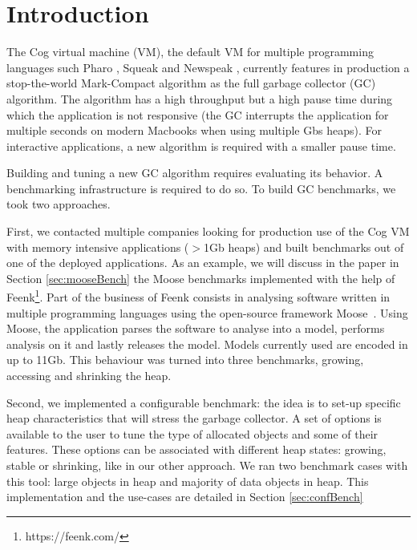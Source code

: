 \documentclass[10pt, sigplan]{acmart}
\begin{document}

\maketitle

\section{Introduction} \label{sec:intro}

The Cog virtual machine (VM), the default VM for multiple programming languages such Pharo \cite{PharoByExample}, Squeak \cite{SqueakByExample} and Newspeak \cite{NewspeakOopsla}, currently features in production a stop-the-world Mark-Compact algorithm as the full garbage collector (GC) algorithm. The algorithm has a high throughput but a high pause time during which the application is not responsive (the GC interrupts the application for multiple seconds on modern Macbooks when using multiple Gbs heaps). For interactive applications, a new algorithm is required with a smaller pause time.

Building and tuning a new GC algorithm requires evaluating its behavior. A benchmarking infrastructure is required to do so. To build GC benchmarks, we took two approaches. 

First, we contacted multiple companies looking for production use of the Cog VM with memory intensive applications ($>$1Gb heaps) and built benchmarks out of one of the deployed applications. As an example, we will discuss in the paper in Section \ref{sec:mooseBench} the Moose benchmarks implemented with the help of Feenk\footnote{https://feenk.com/}. Part of the business of Feenk consists in analysing software written in multiple programming languages using the open-source framework Moose~\cite{MoosePaper1,MooseBook1}. Using Moose, the application parses the software to analyse into a model, performs analysis on it and lastly releases the model. Models currently used are encoded in up to 11Gb. This behaviour was turned into three benchmarks, growing, accessing and shrinking the heap. 

Second, we implemented a configurable benchmark: the idea is to set-up specific heap characteristics that will stress the garbage collector. A set of options is available to the user to tune the type of allocated objects and some of their features. These options can be associated with different heap states: growing, stable or shrinking, like in our other approach. We ran two benchmark cases with this tool: large objects in heap and majority of data objects in heap.
This implementation and the use-cases are detailed in Section \ref{sec:confBench}
\end{document}
